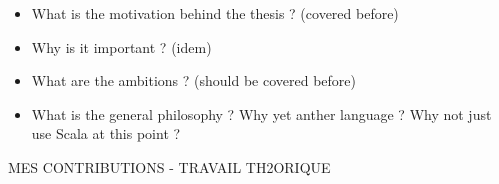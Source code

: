 
\begin{itemize}
    \item What is the motivation behind the thesis ? (covered before)
    \item Why is it important ? (idem)
    \item What are the ambitions ? (should be covered before)
    \item What is the general philosophy ?
    Why yet anther language ?
    Why not just use Scala at this point ?

\end{itemize}

MES CONTRIBUTIONS - TRAVAIL TH2ORIQUE